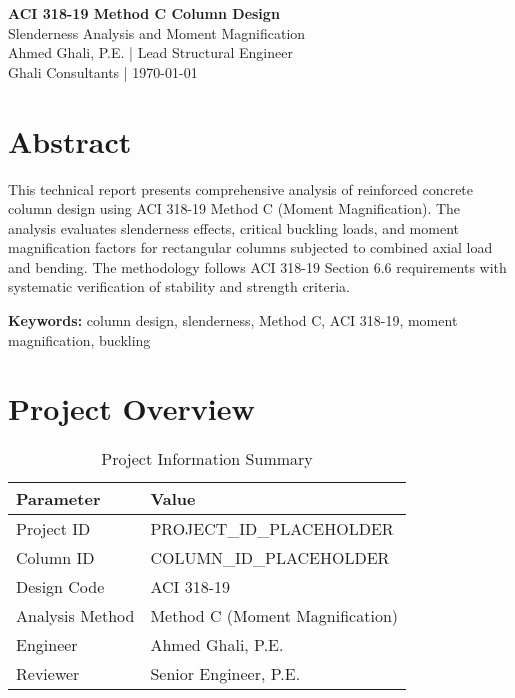 \documentclass[
  10pt,
  letterpaper,
  twocolumn
]{article}
\begin{document}
\thispagestyle{firstpage}

\begin{center}
{\Large\textbf{\textcolor{ghaliblue}{ACI 318-19 Method C Column Design}}} \\[0.3cm]
{\large\textcolor{ghaligray}{Slenderness Analysis and Moment Magnification}} \\[0.5cm]
{\normalsize\textcolor{ghaliblue}{Ahmed Ghali, P.E.} | \textcolor{ghaligray}{Lead Structural Engineer}} \\
{\normalsize\textcolor{ghaligray}{Ghali Consultants | \today}} \\[1cm]
\end{center}

\section*{\textcolor{ghaliblue}{Abstract}}
This technical report presents comprehensive analysis of reinforced concrete column design using ACI 318-19 Method C (Moment Magnification). The analysis evaluates slenderness effects, critical buckling loads, and moment magnification factors for rectangular columns subjected to combined axial load and bending. The methodology follows ACI 318-19 Section 6.6 requirements with systematic verification of stability and strength criteria.

\textbf{Keywords:} column design, slenderness, Method C, ACI 318-19, moment magnification, buckling

\section{Project Overview}

\begin{table}[h]
\centering
\caption{Project Information Summary}
\label{tab:project_info}
\begin{tabular}{@{}ll@{}}
\toprule
\textbf{Parameter} & \textbf{Value} \\
\midrule
Project ID & PROJECT_ID_PLACEHOLDER \\
Column ID & COLUMN_ID_PLACEHOLDER \\
Design Code & ACI 318-19 \\
Analysis Method & Method C (Moment Magnification) \\
Engineer & Ahmed Ghali, P.E. \\
Reviewer & Senior Engineer, P.E. \\
\bottomrule
\end{tabular}
\end{table}
\end{document}
